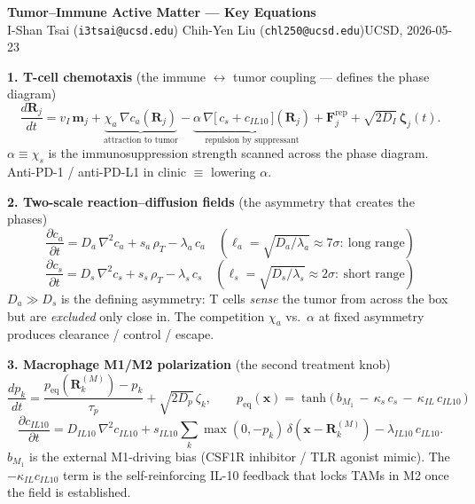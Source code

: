 \documentclass[11pt,letterpaper]{article}
\begin{document}
\begin{center}
  {\Large\bfseries Tumor--Immune Active Matter --- Key Equations}\\[0.2em]
  {\small I-Shan Tsai (\texttt{i3tsai@ucsd.edu}) \quad
          Chih-Yen Liu (\texttt{chl250@ucsd.edu})\quad UCSD, 2026-05-23}
\end{center}

\smallskip

\textbf{1. T-cell chemotaxis} (the immune $\leftrightarrow$ tumor coupling --- defines the phase diagram)
\begin{equation*}
\frac{d\mathbf{R}_j}{dt}
  = v_I\,\mathbf{m}_j
  + \underbrace{\chi_a\,\nabla c_a(\mathbf{R}_j)}_{\text{attraction to tumor}}
  - \underbrace{\alpha\,\nabla\!\big[\,c_s + c_{IL10}\,\big](\mathbf{R}_j)}_{\text{repulsion by suppressant}}
  + \mathbf{F}^{\text{rep}}_j + \sqrt{2 D_I}\,\bm{\zeta}_j(t).
\end{equation*}
$\alpha \equiv \chi_s$ is the immunosuppression strength scanned across the phase diagram. Anti-PD-1 / anti-PD-L1 in clinic $\equiv$ lowering $\alpha$.

\textbf{2. Two-scale reaction--diffusion fields} (the asymmetry that creates the phases)
\begin{equation*}
\frac{\partial c_a}{\partial t} = D_a\,\nabla^2 c_a + s_a\,\rho_T - \lambda_a\,c_a
\quad (\ell_a = \sqrt{D_a/\lambda_a} \approx 7\sigma:\ \text{long range})
\end{equation*}
\begin{equation*}
\frac{\partial c_s}{\partial t} = D_s\,\nabla^2 c_s + s_s\,\rho_T - \lambda_s\,c_s
\quad (\ell_s = \sqrt{D_s/\lambda_s} \approx 2\sigma:\ \text{short range})
\end{equation*}
$D_a \gg D_s$ is the defining asymmetry: T cells \emph{sense} the tumor from across the box but are \emph{excluded} only close in. The competition $\chi_a$ vs.\ $\alpha$ at fixed asymmetry produces clearance / control / escape.

\textbf{3. Macrophage M1/M2 polarization} (the second treatment knob)
\begin{equation*}
\frac{d p_k}{dt} = \frac{p_{\text{eq}}(\mathbf{R}_k^{(M)}) - p_k}{\tau_p} + \sqrt{2 D_p}\,\zeta_k,
\qquad
p_{\text{eq}}(\mathbf{x}) = \tanh\!\big(\,b_{M_1}\,-\,\kappa_s\,c_s\,-\,\kappa_{IL}\,c_{IL10}\,\big)
\end{equation*}
\begin{equation*}
\frac{\partial c_{IL10}}{\partial t} = D_{IL10}\,\nabla^2 c_{IL10}
   + s_{IL10}\sum_k \max(0, -p_k)\,\delta(\mathbf{x} - \mathbf{R}_k^{(M)}) - \lambda_{IL10}\,c_{IL10}.
\end{equation*}
$b_{M_1}$ is the external M1-driving bias (CSF1R inhibitor / TLR agonist mimic). The $-\kappa_{IL}c_{IL10}$ term is the self-reinforcing IL-10 feedback that locks TAMs in M2 once the field is established.
\end{document}
